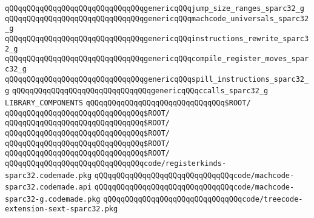 \verb|qQQqqQQqqQQqqQQqqQQqqQQqqQQqqQQqgenericqQQqjump_size_ranges_sparc32_g|\newline
\verb|qQQqqQQqqQQqqQQqqQQqqQQqqQQqqQQqgenericqQQqmachcode_universals_sparc32_g|\newline
\verb|qQQqqQQqqQQqqQQqqQQqqQQqqQQqqQQqgenericqQQqinstructions_rewrite_sparc32_g|\newline
\verb|qQQqqQQqqQQqqQQqqQQqqQQqqQQqqQQqgenericqQQqcompile_register_moves_sparc32_g|\newline
\verb|qQQqqQQqqQQqqQQqqQQqqQQqqQQqqQQqgenericqQQqspill_instructions_sparc32_g|\newline
\verb|qQQqqQQqqQQqqQQqqQQqqQQqqQQqqQQqgenericqQQqccalls_sparc32_g|\newline
\newline
\newline
\newline
\verb|LIBRARY_COMPONENTS|\newline
\newline
\verb|qQQqqQQqqQQqqQQqqQQqqQQqqQQqqQQq$ROOT/|\newline
\verb|qQQqqQQqqQQqqQQqqQQqqQQqqQQqqQQq$ROOT/|\newline
\verb|qQQqqQQqqQQqqQQqqQQqqQQqqQQqqQQq$ROOT/|\newline
\verb|qQQqqQQqqQQqqQQqqQQqqQQqqQQqqQQq$ROOT/|\newline
\verb|qQQqqQQqqQQqqQQqqQQqqQQqqQQqqQQq$ROOT/|\newline
\verb|qQQqqQQqqQQqqQQqqQQqqQQqqQQqqQQq$ROOT/|\newline
\newline
\verb|qQQqqQQqqQQqqQQqqQQqqQQqqQQqqQQqcode/registerkinds-sparc32.codemade.pkg|\newline
\verb|qQQqqQQqqQQqqQQqqQQqqQQqqQQqqQQqcode/machcode-sparc32.codemade.api|\newline
\verb|qQQqqQQqqQQqqQQqqQQqqQQqqQQqqQQqcode/machcode-sparc32-g.codemade.pkg|\newline
\verb|qQQqqQQqqQQqqQQqqQQqqQQqqQQqqQQqcode/treecode-extension-sext-sparc32.pkg|\newline
